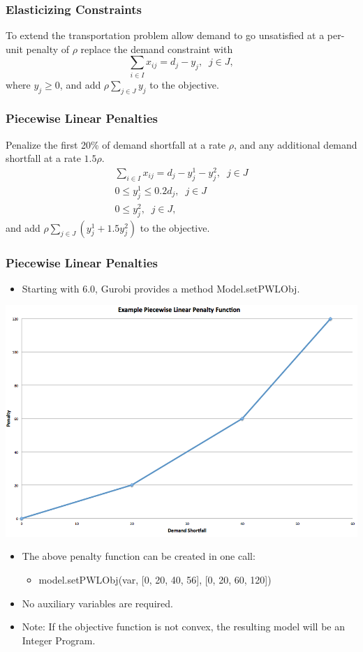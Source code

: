 \documentclass[12pt,handout]{beamer}
\begin{document}
\begin{frame}
\frametitle{Elasticizing Constraints}
To extend the transportation problem allow demand to go unsatisfied at a per-unit penalty of $\rho$ replace the demand constraint with
\begin{equation}
\sum_{i \in I} x_{ij} = d_j - y_j,\;\;j \in J, \nonumber
\end{equation}
\noindent where $y_j \ge 0$, and add $\rho \sum_{j \in J} y_j$ to the objective.
\end{frame}

\begin{frame}
\frametitle{Piecewise Linear Penalties}
Penalize the first 20\% of demand shortfall at a rate $\rho$, and any additional demand shortfall at a rate $1.5\rho$.
\begin{eqnarray}
\sum_{i \in I} x_{ij} = d_j - y_j^1 - y_j^2,\;\;j \in J \nonumber \\
0 \le y_j^1 \le 0.2d_j,\;\;j \in J \nonumber \\
0 \le y_j^2,\;\;j \in J, \nonumber
\end{eqnarray}
\noindent and add $\rho \sum_{j \in J} (y_j^1 + 1.5 y_j^2)$ to the objective.


\end{frame}

\begin{frame}
\frametitle{Piecewise Linear Penalties}
\begin{itemize}
\item Starting with 6.0, Gurobi provides a method Model.setPWLObj.
\end{itemize}
\begin{center}
\includegraphics[scale=0.2]{piecewise_linear.png}
\end{center}
\begin{itemize}
\item The above penalty function can be created in one call:
\begin{itemize}
\item model.setPWLObj(var, [0, 20, 40, 56], [0, 20, 60, 120])
\end{itemize}
\item No auxiliary variables are required.
\item Note: If the objective function is not convex, the resulting model will be an Integer Program.
\end{itemize}
\end{frame}
\end{document}
